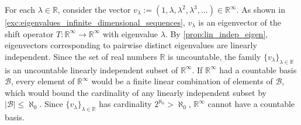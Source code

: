 \begin{exercisesolution}
\label{sol:uncountable_dimension_sequence_space}
For each $\lambda \in \mathbb{R}$, consider the vector $v_\lambda := (1, \lambda, \lambda^2, \lambda^3, \dots) \in \mathbb{R}^\infty$.
As shown in \cref{exc:eigenvalues_infinite_dimensional_sequences}, $v_\lambda$ is an eigenvector of the shift operator $T \colon \mathbb{R}^\infty \to \mathbb{R}^\infty$ with eigenvalue $\lambda$.
By \cref{prop:lin_indep_eigen}, eigenvectors corresponding to pairwise distinct eigenvalues are linearly independent.
Since the set of real numbers $\mathbb{R}$ is uncountable, the family $\{v_\lambda\}_{\lambda \in \mathbb{R}}$ is an uncountable linearly independent subset of $\mathbb{R}^\infty$.
If $\mathbb{R}^\infty$ had a countable basis $\mathcal{B}$, every element of $\mathbb{R}^\infty$ would be a finite linear combination of elements of $\mathcal{B}$, which would bound the cardinality of any linearly independent subset by $|\mathcal{B}| \le \aleph_0$.
Since $\{v_\lambda\}_{\lambda \in \mathbb{R}}$ has cardinality $2^{\aleph_0} > \aleph_0$, $\mathbb{R}^\infty$ cannot have a countable basis.
\end{exercisesolution}

